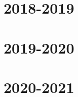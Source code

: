\documentclass[12pt, a4paper]{article}
\theoremstyle{definition}
\begin{document}


\section{2018-2019}



\section{2019-2020}




\section{2020-2021}


\end{document}
